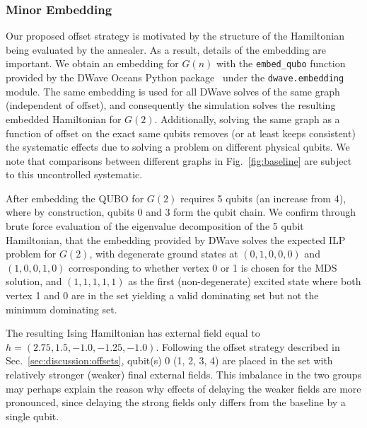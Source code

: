 \documentclass[prd,twocolumn,tightenlines,preprintnumbers,showpacs,superscriptaddress,notitlepage,nofootinbib,eqsecnum,floatfix,longbibliography,aps,10pt]{revtex4-2}
\begin{document}
\subsubsection{Minor Embedding}
\label{sec:methods:minor_embedding}
Our proposed offset strategy is motivated by the structure of the Hamiltonian being evaluated by the annealer.
As a result, details of the embedding are important. We obtain an embedding for $G(n)$ with the \texttt{embed\_qubo} function provided by the DWave Oceans Python package~\cite{dwave_oceans} under the \texttt{dwave.embedding} module.
The same embedding is used for all DWave solves of the same graph (independent of offset), and consequently the simulation solves the resulting embedded Hamiltonian for $G(2)$.
Additionally, solving the same graph as a function of offset on the exact same qubits removes (or at least keeps consistent) the systematic effects due to solving a problem on different physical qubits.
We note that comparisons between different graphs in Fig.~\ref{fig:baseline} are subject to this uncontrolled systematic.

After embedding the QUBO for $G(2)$ requires 5 qubits (an increase from 4), where by construction, qubits 0 and 3 form the qubit chain.
We confirm through brute force evaluation of the eigenvalue decomposition of the 5 qubit Hamiltonian, that the embedding provided by DWave solves the expected ILP problem for $G(2)$, with degenerate ground states at $(0, 1, 0, 0, 0)$ and $(1, 0, 0, 1, 0)$ corresponding to whether vertex 0 or 1 is chosen for the MDS solution, and $(1, 1, 1, 1, 1)$ as the first (non-degenerate) excited state where both vertex 1 and 0 are in the set yielding a valid dominating set but not the minimum dominating set.

The resulting Ising Hamiltonian has external field equal to $h = (2.75, 1.5, -1.0, -1.25, -1.0)$.
Following the offset strategy described in Sec.~\ref{sec:discussion:offsets}, qubit(s) 0 (1, 2, 3, 4) are placed in the set with relatively stronger (weaker) final external fields.
This imbalance in the two groups may perhaps explain the reason why effects of delaying the weaker fields are more pronounced, since delaying the strong fields only differs from the baseline by a single qubit.


\end{document}
